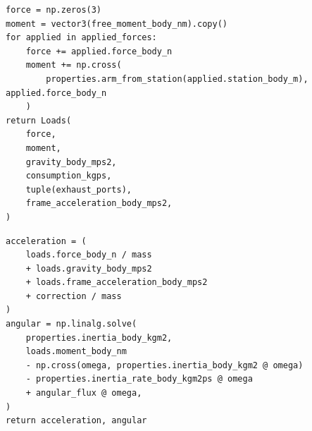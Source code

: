 \par\smallskip\noindent\begin{minipage}{\linewidth}
\begingroup\footnotesize
\begin{verbatim}
force = np.zeros(3)
moment = vector3(free_moment_body_nm).copy()
for applied in applied_forces:
    force += applied.force_body_n
    moment += np.cross(
        properties.arm_from_station(applied.station_body_m), applied.force_body_n
    )
return Loads(
    force,
    moment,
    gravity_body_mps2,
    consumption_kgps,
    tuple(exhaust_ports),
    frame_acceleration_body_mps2,
)
\end{verbatim}
\endgroup
{}\label{fig:app-load-code}
\end{minipage}\par\smallskip
\par\smallskip\noindent\begin{minipage}{\linewidth}
\begingroup\footnotesize
\begin{verbatim}
acceleration = (
    loads.force_body_n / mass
    + loads.gravity_body_mps2
    + loads.frame_acceleration_body_mps2
    + correction / mass
)
angular = np.linalg.solve(
    properties.inertia_body_kgm2,
    loads.moment_body_nm
    - np.cross(omega, properties.inertia_body_kgm2 @ omega)
    - properties.inertia_rate_body_kgm2ps @ omega
    + angular_flux @ omega,
)
return acceleration, angular
\end{verbatim}
\endgroup
{}\label{fig:app-dynamics-code}
\end{minipage}\par\smallskip
